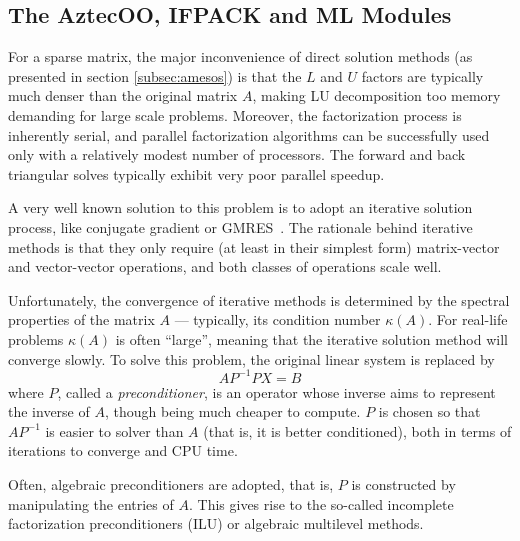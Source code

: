 \documentclass[acmtocl]{acmtrans2m}
\begin{document}
\subsection{The AztecOO, IFPACK and ML Modules}
\label{subsec:aztecoo_ifpack}

For a sparse matrix, the major inconvenience of direct solution
methods (as presented in section \ref{subsec:amesos}) is that the $L$
and $U$ factors are typically much denser than the original matrix
$A$, making LU decomposition too memory demanding for large scale
problems. Moreover, the factorization process is inherently serial,
and parallel factorization algorithms can be successfully used only
with a relatively modest number of processors. The forward and back
triangular solves typically exhibit very poor parallel speedup.

A very well known solution to this problem is to adopt an iterative
solution process, like conjugate gradient or
GMRES~\cite{golub96matrix}. The rationale behind iterative methods
is that they only require (at least in their simplest form)
matrix-vector and vector-vector operations, and both classes of
operations scale well.

Unfortunately, the convergence of iterative methods is determined by
the spectral properties of the matrix $A$ --- typically, its condition
number $\kappa(A)$.  For real-life problems $\kappa(A)$ is often
``large'', meaning that the iterative solution method will converge
slowly. To solve this problem, the original linear system is replaced
by
\[
A P^{-1} P X = B
\]
where $P$, called a {\sl preconditioner}, is an operator whose inverse
aims to represent the inverse of $A$, though being much cheaper to
compute.  $P$ is chosen so that $AP^{-1}$ is easier to solver than $A$
(that is, it is better conditioned), both in terms of iterations to
converge and CPU time.

\smallskip

Often, algebraic preconditioners are adopted, that is, $P$ is
constructed by manipulating the entries of $A$. This gives rise to the
so-called incomplete factorization preconditioners (ILU) or algebraic
multilevel methods.
\end{document}
